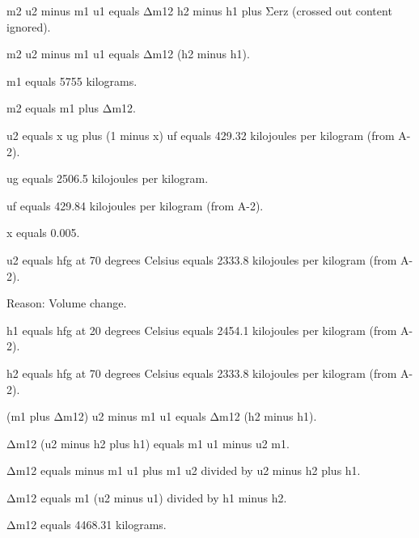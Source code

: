 m2 u2 minus m1 u1 equals Δm12 h2 minus h1 plus Σerz (crossed out content ignored).

m2 u2 minus m1 u1 equals Δm12 (h2 minus h1).

m1 equals 5755 kilograms.

m2 equals m1 plus Δm12.

u2 equals x ug plus (1 minus x) uf equals 429.32 kilojoules per kilogram (from A-2).

ug equals 2506.5 kilojoules per kilogram.

uf equals 429.84 kilojoules per kilogram (from A-2).

x equals 0.005.

u2 equals hfg at 70 degrees Celsius equals 2333.8 kilojoules per kilogram (from A-2).

Reason: Volume change.

h1 equals hfg at 20 degrees Celsius equals 2454.1 kilojoules per kilogram (from A-2).

h2 equals hfg at 70 degrees Celsius equals 2333.8 kilojoules per kilogram (from A-2).

(m1 plus Δm12) u2 minus m1 u1 equals Δm12 (h2 minus h1).

Δm12 (u2 minus h2 plus h1) equals m1 u1 minus u2 m1.

Δm12 equals minus m1 u1 plus m1 u2 divided by u2 minus h2 plus h1.

Δm12 equals m1 (u2 minus u1) divided by h1 minus h2.

Δm12 equals 4468.31 kilograms.